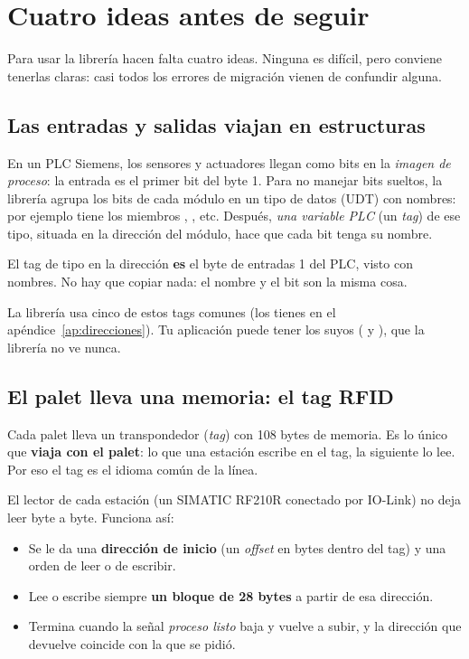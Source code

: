 \chapter{Cuatro ideas antes de seguir}\label{cap:conceptos}

Para usar la librería hacen falta cuatro ideas. Ninguna es difícil, pero conviene tenerlas claras: casi todos los errores de migración vienen de confundir alguna.

\section{Las entradas y salidas viajan en estructuras}
En un PLC Siemens, los sensores y actuadores llegan como bits en la \emph{imagen de proceso}: la entrada  es el primer bit del byte 1. Para no manejar bits sueltos, la librería agrupa los bits de cada módulo en un tipo de datos (UDT) con nombres: por ejemplo  tiene los miembros , , etc. Después, \emph{una variable PLC} (un \emph{tag}) de ese tipo, situada en la dirección del módulo, hace que cada bit tenga su nombre.

\begin{idea}
El tag  de tipo  en la dirección  \textbf{es} el byte de entradas 1 del PLC, visto con nombres. No hay que copiar nada: el nombre y el bit son la misma cosa.
\end{idea}

La librería usa cinco de estos tags comunes (los tienes en el apéndice~\ref{ap:direcciones}). Tu aplicación puede tener los suyos ( y ), que la librería no ve nunca.

\section{El palet lleva una memoria: el tag RFID}
Cada palet lleva un transpondedor (\emph{tag}) con 108 bytes de memoria. Es lo único que \textbf{viaja con el palet}: lo que una estación escribe en el tag, la siguiente lo lee. Por eso el tag es el idioma común de la línea.

El lector de cada estación (un SIMATIC RF210R conectado por IO-Link) no deja leer byte a byte. Funciona así:
\begin{itemize}
\item Se le da una \textbf{dirección de inicio} (un \emph{offset} en bytes dentro del tag) y una orden de leer o de escribir.
\item Lee o escribe siempre \textbf{un bloque de 28 bytes} a partir de esa dirección.
\item Termina cuando la señal \emph{proceso listo} baja y vuelve a subir, y la dirección que devuelve coincide con la que se pidió.
\end{itemize}

